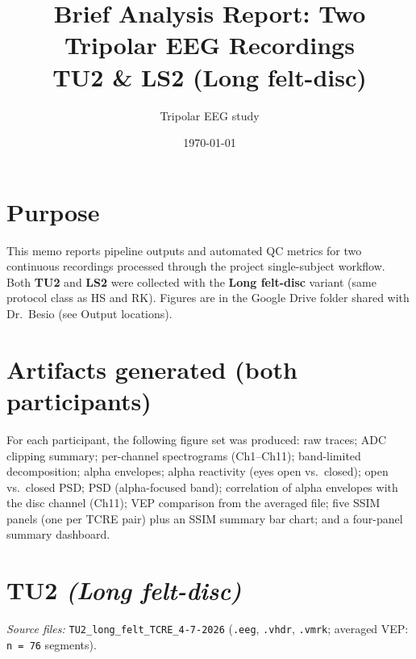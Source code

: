 \documentclass[11pt]{article}
\title{Brief Analysis Report: Two Tripolar EEG Recordings\\{\large TU2 \& LS2 (Long felt-disc)}}
\author{Tripolar EEG study}
\date{\today}
\begin{document}
\maketitle

\section*{Purpose}
This memo reports pipeline outputs and automated QC metrics for two continuous recordings processed through the project single-subject workflow. Both \textbf{TU2} and \textbf{LS2} were collected with the \textbf{Long felt-disc} variant (same protocol class as HS and RK). Figures are in the Google Drive folder shared with Dr.\ Besio (see Output locations).

\section*{Artifacts generated (both participants)}
For each participant, the following figure set was produced: raw traces; ADC clipping summary; per-channel spectrograms (Ch1--Ch11); band-limited decomposition; alpha envelopes; alpha reactivity (eyes open vs.\ closed); open vs.\ closed PSD; PSD (alpha-focused band); correlation of alpha envelopes with the disc channel (Ch11); VEP comparison from the averaged file; five SSIM panels (one per TCRE pair) plus an SSIM summary bar chart; and a four-panel summary dashboard.

\section*{TU2 \textnormal{\textit{(Long felt-disc)}} }
\textit{Source files:} \texttt{TU2\_long\_felt\_TCRE\_4-7-2026} (\texttt{.eeg}, \texttt{.vhdr}, \texttt{.vmrk}; averaged VEP: \texttt{n\,=\,76} segments).
\end{document}
